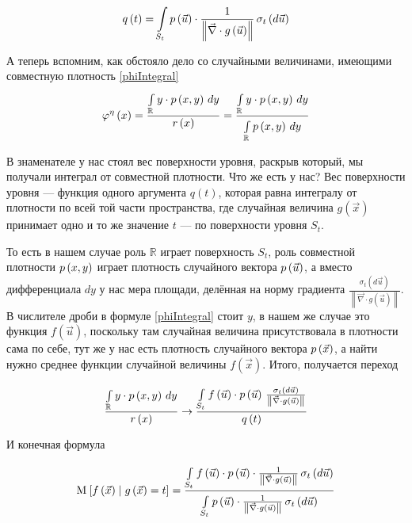 \begin{equation}\label{formula:conditionDencity}
  q\left( t \right)
  = \integrall{S_t}{\sigma_{t}\left(d\vec{u} \right)}{
      \pdf{\vec{u}} \cdot \frac{1}
      {\left\| \vec{\nabla} \cdot g\left( \vec{u} \right) \right\|}}
\end{equation}

А теперь вспомним, как обстояло дело со случайными величинами,
имеющими совместную плотность \eqref{phiIntegral}
$$\varphi^{\eta}\left( x \right)
  = \frac{\integral{\mathbb{R}}{}{y}{y \cdot \pdf{x,y}}}
      {r\left( x \right)}
  = \frac{\integral{\mathbb{R}}{}{y}{y \cdot \pdf{x,y}}}
      {\integral{\mathbb{R}}{}{y}{\pdf{x,y}}}$$

В знаменателе у нас стоял вес поверхности уровня,
раскрыв который, мы получали интеграл от совместной плотности.
Что же есть у нас?
Вес поверхности уровня --- функция одного аргумента $q\left( t \right)$,
которая равна интегралу от плотности по всей той части пространства,
где случайная величина $g\left( \vec{x} \right)$
принимает одно и то же значение $t$ --- по поверхности уровня $S_t$.

То есть в нашем случае роль $\mathbb{R}$ играет поверхность $S_t$,
роль совместной плотности $\pdf{x,y}$ играет плотность случайного вектора
$\pdf{\vec{u}}$, а вместо дифференциала $dy$ у нас мера площади,
делённая на норму градиента $\frac{\sigma_{t}\left( d\vec{u} \right)}
{\left\| \vec{\nabla} \cdot g\left( \vec{u} \right) \right\|}$.
В числителе дроби в формуле \eqref{phiIntegral} стоит $y$,
в нашем же случае это функция $f\left( \vec{u} \right)$,
поскольку там случайная величина присутствовала в плотности сама по себе,
тут же у нас есть плотность случайного вектора $\pdf{\vec{x}}$,
а найти нужно среднее функции случайной величины $f\left( \vec{x} \right)$.
Итого, получается переход

$$\frac{\integral{\mathbb{R}}{}{y}{y \cdot \pdf{x,y}}}{r\left( x \right)}
  \rightarrow
      \frac{\integrall{S_t}{\frac{\sigma_{t}\left( d\vec{u} \right)}{
      \left\| \vec{\nabla} \cdot g\left( \vec{u} \right) \right\|}}{
      f\left( \vec{u} \right) \cdot \pdf{\vec{u}}}}{q\left( t \right)}$$

И конечная формула

$$\Mean{ f\left( \vec{x} \right) \mcond g\left( \vec{x} \right) = t }
  = \frac{\integrall{S_t}{\sigma_{t}\left(d\vec{u} \right)}{
      f\left( \vec{u} \right) \cdot \pdf{\vec{u}} \cdot \frac{1}{
      \left\| \vec{\nabla} \cdot g\left( \vec{u} \right) \right\|}}}
      {\integrall{S_t}{\sigma_{t}\left(d\vec{u} \right)}{
      \pdf{\vec{u}} \cdot \frac{1}{
      \left\| \vec{\nabla} \cdot g\left( \vec{u} \right) \right\|}}}$$

